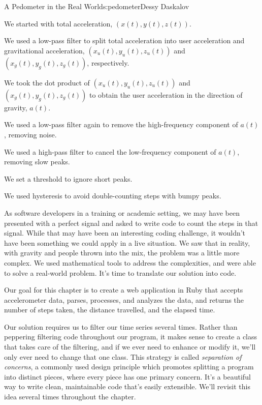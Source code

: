 \begin{aosachapter}{A Pedometer in the Real World}{s:pedometer}{Dessy Daskalov}
\begin{aosaenumerate}
\item
  We started with total acceleration, $(x(t), y(t), z(t))$.
\item
  We used a low-pass filter to split total acceleration into user
  acceleration and gravitational acceleration,
  $(x_{u}(t), y_{u}(t), z_{u}(t))$ and $(x_{g}(t), y_{g}(t), z_{g}(t))$,
  respectively.
\item
  We took the dot product of $(x_{u}(t), y_{u}(t), z_{u}(t))$ and
  $(x_{g}(t), y_{g}(t), z_{g}(t))$ to obtain the user acceleration in
  the direction of gravity, $a(t)$.
\item
  We used a low-pass filter again to remove the high-frequency component
  of $a(t)$, removing noise.
\item
  We used a high-pass filter to cancel the low-frequency component of
  $a(t)$, removing slow peaks.
\item
  We set a threshold to ignore short peaks.
\item
  We used hysteresis to avoid double-counting steps with bumpy peaks.
\end{aosaenumerate}

As software developers in a training or academic setting, we may have
been presented with a perfect signal and asked to write code to count
the steps in that signal. While that may have been an interesting coding
challenge, it wouldn't have been something we could apply in a live
situation. We saw that in reality, with gravity and people thrown into
the mix, the problem was a little more complex. We used mathematical
tools to address the complexities, and were able to solve a real-world
problem. It's time to translate our solution into code.

\label{diving-into-code}

Our goal for this chapter is to create a web application in Ruby that
accepts accelerometer data, parses, processes, and analyzes the data,
and returns the number of steps taken, the distance travelled, and the
elapsed time.

\label{preliminary-work}

Our solution requires us to filter our time series several times. Rather
than peppering filtering code throughout our program, it makes sense to
create a class that takes care of the filtering, and if we ever need to
enhance or modify it, we'll only ever need to change that one class.
This strategy is called \emph{separation of concerns}, a commonly used
design principle which promotes splitting a program into distinct
pieces, where every piece has one primary concern. It's a beautiful way
to write clean, maintainable code that's easily extensible. We'll
revisit this idea several times throughout the chapter.


\end{aosachapter}

